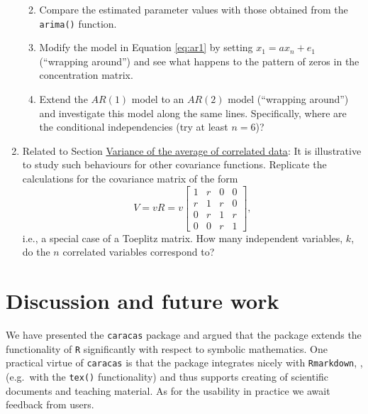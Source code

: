 \begin{enumerate}
  \begin{enumerate}
  \def\labelenumii{\alph{enumii})}
  \tightlist
  \item
    Compare the estimated parameter values with those obtained from
    the \texttt{arima()} function.
  \item
    Modify the model in Equation \eqref{eq:ar1} by
    setting \(x_1 = a x_n + e_1\) (``wrapping around'') and see what happens
    to the pattern of zeros in the concentration matrix.
  \item
    Extend the
    \(AR(1)\) model to an \(AR(2)\) model (``wrapping around'') and
    investigate this model along the same lines. Specifically,
    where are the conditional independencies (try at least \(n=6\))?
  \end{enumerate}
\item
  Related to Section \protect\hyperlink{variance-of-the-average-of-correlated-data}{Variance of the average of correlated data}: It
  is illustrative to study such behaviours for other covariance
  functions.
  Replicate the calculations for the covariance matrix of the form
  \begin{equation}
    \label{eq:ex5}
    V = v R = v \left[\begin{matrix}1 & r & 0 & 0\\r & 1 & r & 0\\0 & r & 1 & r\\0 & 0 & r & 1\end{matrix}\right],
  \end{equation}
  i.e., a special case of a Toeplitz matrix.
  How many independent variables, \(k\), do
  the \(n\) correlated variables correspond to?
\end{enumerate}

\hypertarget{discussion-and-future-work}{%
\section{Discussion and future work}\label{discussion-and-future-work}}

We have presented the \texttt{caracas} package and argued that the
package extends the functionality of \texttt{R} significantly with respect to
symbolic mathematics. One practical virtue of \texttt{caracas} is
that the package integrates nicely with \texttt{Rmarkdown}, 
\cite{rmarkdown}, (e.g.~with the \texttt{tex()} functionality) and thus
supports creating of scientific documents and teaching material. As
for the usability in practice we await feedback from users.

